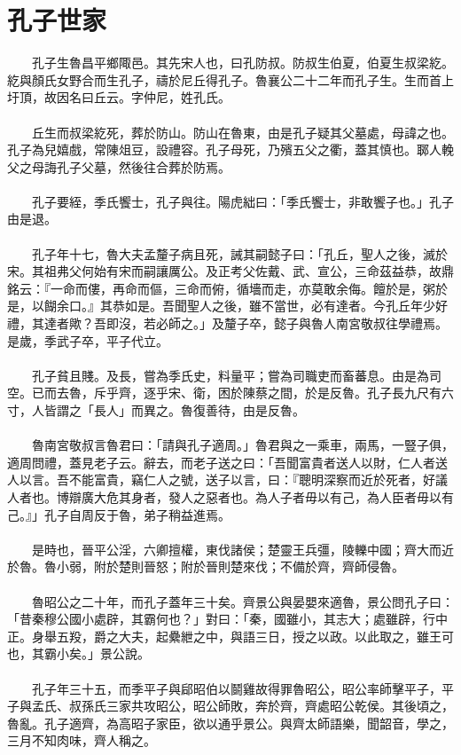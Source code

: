 \section{孔子世家}
　　孔子生魯昌平鄉陬邑。其先宋人也，曰孔防叔。防叔生伯夏，伯夏生叔梁紇。紇與顏氏女野合而生孔子，禱於尼丘得孔子。魯襄公二十二年而孔子生。生而首上圩頂，故因名曰丘云。字仲尼，姓孔氏。
\\\\
　　丘生而叔梁紇死，葬於防山。防山在魯東，由是孔子疑其父墓處，母諱之也。孔子為兒嬉戲，常陳俎豆，設禮容。孔子母死，乃殯五父之衢，蓋其慎也。郰人輓父之母誨孔子父墓，然後往合葬於防焉。
\\\\
　　孔子要絰，季氏饗士，孔子與往。陽虎絀曰：「季氏饗士，非敢饗子也。」孔子由是退。
\\\\
　　孔子年十七，魯大夫孟釐子病且死，誡其嗣懿子曰：「孔丘，聖人之後，滅於宋。其祖弗父何始有宋而嗣讓厲公。及正考父佐戴、武、宣公，三命茲益恭，故鼎銘云：『一命而僂，再命而傴，三命而俯，循墻而走，亦莫敢余侮。饘於是，粥於是，以餬余口。』其恭如是。吾聞聖人之後，雖不當世，必有達者。今孔丘年少好禮，其達者歟？吾即沒，若必師之。」及釐子卒，懿子與魯人南宮敬叔往學禮焉。是歲，季武子卒，平子代立。
\\\\
　　孔子貧且賤。及長，嘗為季氏史，料量平；嘗為司職吏而畜蕃息。由是為司空。已而去魯，斥乎齊，逐乎宋、衛，困於陳蔡之間，於是反魯。孔子長九尺有六寸，人皆謂之「長人」而異之。魯復善待，由是反魯。
\\\\
　　魯南宮敬叔言魯君曰：「請與孔子適周。」魯君與之一乘車，兩馬，一豎子俱，適周問禮，蓋見老子云。辭去，而老子送之曰：「吾聞富貴者送人以財，仁人者送人以言。吾不能富貴，竊仁人之號，送子以言，曰：『聰明深察而近於死者，好議人者也。博辯廣大危其身者，發人之惡者也。為人子者毋以有己，為人臣者毋以有己。』」孔子自周反于魯，弟子稍益進焉。
\\\\
　　是時也，晉平公淫，六卿擅權，東伐諸侯；楚靈王兵彊，陵轢中國；齊大而近於魯。魯小弱，附於楚則晉怒；附於晉則楚來伐；不備於齊，齊師侵魯。
\\\\
　　魯昭公之二十年，而孔子蓋年三十矣。齊景公與晏嬰來適魯，景公問孔子曰：「昔秦穆公國小處辟，其霸何也？」對曰：「秦，國雖小，其志大；處雖辟，行中正。身舉五羖，爵之大夫，起纍紲之中，與語三日，授之以政。以此取之，雖王可也，其霸小矣。」景公說。
\\\\
　　孔子年三十五，而季平子與郈昭伯以鬬雞故得罪魯昭公，昭公率師擊平子，平子與孟氏、叔孫氏三家共攻昭公，昭公師敗，奔於齊，齊處昭公乾侯。其後頃之，魯亂。孔子適齊，為高昭子家臣，欲以通乎景公。與齊太師語樂，聞韶音，學之，三月不知肉味，齊人稱之。
